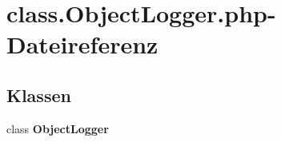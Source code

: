 \section{class.ObjectLogger.php-Dateireferenz}
\label{class_8ObjectLogger_8php}
\subsection*{Klassen}
\begin{CompactItemize}
\item 
class {\bf ObjectLogger}
\end{CompactItemize}

